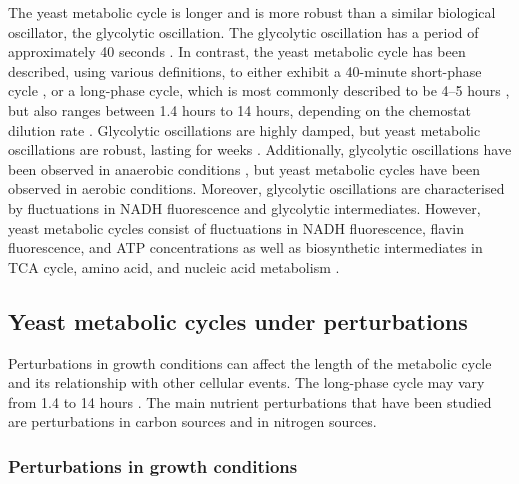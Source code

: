 The yeast metabolic cycle is longer and is more robust than a similar biological oscillator, the glycolytic oscillation.
The glycolytic oscillation has a period of approximately 40 seconds \parencite{olsenRegulationGlycolyticOscillations2009}.
In contrast, the yeast metabolic cycle has been described, using various definitions, to either exhibit a 40-minute short-phase cycle \parencite{lloydUltradianMetronomeTimekeeper2005, liRapidGenomescaleResponse2006, lloydRedoxRhythmicityClocks2007}, or a long-phase cycle, which is most commonly described to be 4--5 hours \parencite{tuLogicYeastMetabolic2005, tuCyclicChangesMetabolic2007}, but also ranges between 1.4 hours to 14 hours, depending on the chemostat dilution rate \parencite{beuseEffectDilutionRate1998}.
Glycolytic oscillations are highly damped, but yeast metabolic oscillations are robust, lasting for weeks \parencite{lloydRedoxRhythmicityClocks2007}.
Additionally, glycolytic oscillations have been observed in anaerobic conditions \parencite{lloydSaccharomycesCerevisiaeOscillatory2019}, but yeast metabolic cycles have been observed in aerobic conditions.
Moreover, glycolytic oscillations are characterised by fluctuations in NADH fluorescence and glycolytic intermediates.
However, yeast metabolic cycles consist of fluctuations in NADH fluorescence, flavin fluorescence, and ATP concentrations as well as biosynthetic intermediates in TCA cycle, amino acid, and nucleic acid metabolism \parencite{tuCyclicChangesMetabolic2007}.


\subsection{Yeast metabolic cycles under perturbations}
\label{subsec:intro-ymc-perturbations}

Perturbations in growth conditions can affect the length of the metabolic cycle and its relationship with other cellular events.
The long-phase cycle may vary from 1.4 to 14 hours \parencite{caustonMetabolicRhythmsFramework2018}.
The main nutrient perturbations that have been studied are perturbations in carbon sources and in nitrogen sources.

\subsubsection{Perturbations in growth conditions}
\label{subsubsec:intro-ymc-perturbations-nutrient}


